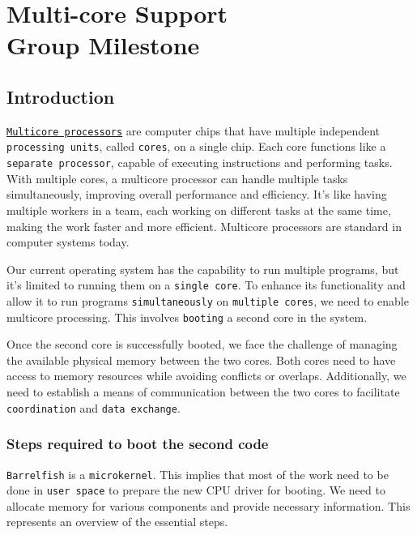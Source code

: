 \chapter[Multi-core Support]{Multi-core Support \\ \Large \textnormal{Group Milestone}}


\section{Introduction}

\href{https://en.wikipedia.org/wiki/Multi-core_processor}{\texttt{Multicore processors}} are computer chips that have multiple independent \texttt{processing units}, called \texttt{cores}, on a single chip. Each core functions like a \texttt{separate processor}, capable of executing instructions and performing tasks. With multiple cores, a multicore processor can handle multiple tasks simultaneously, improving overall performance and efficiency. It's like having multiple workers in a team, each working on different tasks at the same time, making the work faster and more efficient. Multicore processors are standard in computer systems today.

Our current operating system has the capability to run multiple programs, but it's limited to running them on a \texttt{single core}. To enhance its functionality and allow it to run programs \texttt{simultaneously} on \texttt{multiple cores}, we need to enable multicore processing. This involves \texttt{booting} a second core in the system.

Once the second core is successfully booted, we face the challenge of managing the available physical memory between the two cores. Both cores need to have access to memory resources while avoiding conflicts or overlaps. Additionally, we need to establish a means of communication between the two cores to facilitate \texttt{coordination} and \texttt{data exchange}.

\subsection{Steps required to boot the second code}

\texttt{Barrelfish} is a \texttt{microkernel}. This implies that most of the work need to be done in \texttt{user space} to prepare the new CPU driver for booting. We need to allocate memory for various components and provide necessary information. This represents an overview of the essential steps.

